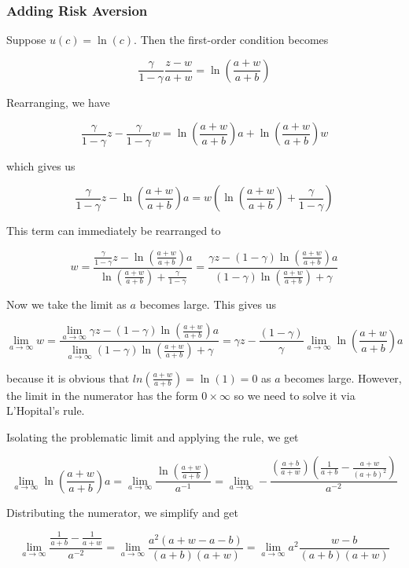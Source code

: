\documentclass[12pt, letterpaper, parskip = full]{article}
\begin{document}
    \subsubsection{Adding Risk Aversion}

    Suppose \(u(c) = \ln(c)\). Then the first-order condition becomes

    \[ \frac{\gamma}{1 - \gamma} \frac{z - w}{a + w} = \ln(\frac{a + w}{a + b})      \]

    Rearranging, we have 

    \[  \frac{\gamma}{1 - \gamma} z - \frac{\gamma}{1 - \gamma} w = \ln(\frac{a + w}{a + b}) a + \ln(\frac{a + w}{a + b}) w  \]

    which gives us

    \[ \frac{\gamma}{1 - \gamma} z - \ln(\frac{a + w}{a + b}) a = w \left(\ln(\frac{a + w}{a + b}) + \frac{\gamma}{1 - \gamma} \right)   \]

    This term can immediately be rearranged to 

    \[ w = \frac{\frac{\gamma}{1 - \gamma} z - \ln(\frac{a + w}{a + b}) a}{\ln(\frac{a + w}{a + b}) + \frac{\gamma}{1 - \gamma}} = \frac{\gamma z - (1 - \gamma)\ln(\frac{a + w}{a + b}) a}{(1 - \gamma)\ln(\frac{a + w}{a + b}) + \gamma}    \]

    Now we take the limit as \(a\) becomes large. This gives us

    \[ \lim_{a \rightarrow \infty} w = \frac{\lim_{a \rightarrow \infty} \gamma z - (1 - \gamma)\ln(\frac{a + w}{a + b}) a}{\lim_{a \rightarrow \infty} (1 - \gamma)\ln(\frac{a + w}{a + b}) + \gamma} = \gamma z - \frac{(1 - \gamma)}{\gamma} \lim_{a \rightarrow \infty} \ln(\frac{a + w}{a + b}) a   \]

    because it is obvious that \(ln(\frac{a+w}{a+b}) = \ln(1) = 0\) as \(a\) becomes large. However, the limit in the numerator has the form \(0 \times \infty\) so we need to solve it via L'Hopital's rule. 

    Isolating the problematic limit and applying the rule, we get

    \[ \lim_{a \rightarrow \infty} \ln(\frac{a + w}{a + b}) a = \lim_{a \rightarrow \infty} \frac{\ln(\frac{a + w}{a + b})}{a^{-1}} = \lim_{a \rightarrow \infty} - \frac{\left(\frac{a+b}{a+w}\right) \left( \frac{1}{a+b} - \frac{a+w}{(a+b)^2} \right)}{a^{-2}}     \]

    Distributing the numerator, we simplify and get

    \[ \lim_{a \rightarrow \infty} \frac{\frac{1}{a+b} - \frac{1}{a+w}}{a^{-2}} = \lim_{a \rightarrow \infty} \frac{a^2 \left(a + w - a - b\right)}{(a+b)(a+w)} = \lim_{a \rightarrow \infty} a^2 \frac{w - b}{(a+b)(a+w)}  \]
\end{document}
